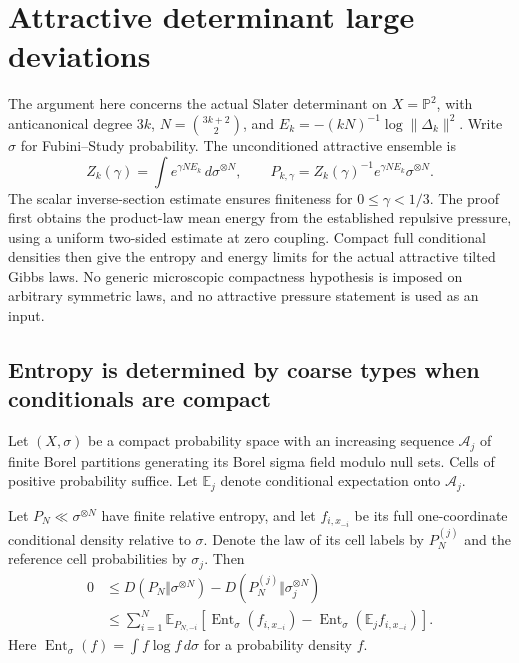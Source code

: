 \section{Attractive determinant large deviations}
\label{att:entropy-section}

The argument here concerns the actual Slater determinant on $X=\mathbb
P^2$, with anticanonical degree $3k$, $N=\binom{3k+2}{2}$, and
$E_k=-(kN)^{-1}\log\|\Delta_k\|^2$. Write $\sigma$ for
Fubini--Study probability. The unconditioned attractive ensemble is
\[
 Z_k(\gamma)=\int e^{\gamma N E_k}\,d\sigma^{\otimes N},
 \qquad P_{k,\gamma}=Z_k(\gamma)^{-1}e^{\gamma N E_k}\sigma^{\otimes N}.
\]
The scalar inverse-section estimate ensures finiteness for $0\le\gamma<1/3$.
The proof first obtains the product-law mean energy from the established
repulsive pressure, using a uniform two-sided estimate at zero coupling.
Compact full conditional densities then give the entropy and energy
limits for the actual attractive tilted Gibbs laws. No generic
microscopic compactness hypothesis is imposed on arbitrary symmetric
laws, and no attractive pressure statement is used as an input.

\subsection{Entropy is determined by coarse types when conditionals are compact}

Let $(X,\sigma)$ be a compact probability space with an increasing
sequence $\mathcal A_j$ of finite Borel partitions generating its Borel
sigma field modulo null sets. Cells of positive probability suffice.
Let $\mathbb E_j$ denote conditional expectation onto $\mathcal A_j$.

\begin{lemma}
\label{att:coarse-entropy}
Let $P_N\ll\sigma^{\otimes N}$ have finite relative entropy, and let
$f_{i,x_{-i}}$ be its full one-coordinate conditional density relative
to $\sigma$. Denote the law of its cell labels by $P_N^{(j)}$ and the
reference cell probabilities by $\sigma_j$. Then
\begin{align}
 0&\le D(P_N\Vert\sigma^{\otimes N})-
               D(P_N^{(j)}\Vert\sigma_j^{\otimes N})\\
 &\le\sum_{i=1}^N\mathbb E_{P_{N,-i}}
    \left[\operatorname{Ent}_\sigma(f_{i,x_{-i}})
              -\operatorname{Ent}_\sigma(\mathbb E_j f_{i,x_{-i}})\right].
 \label{att:coarse-bound}
\end{align}
Here $\operatorname{Ent}_\sigma(f)=\int f\log f\,d\sigma$ for a
probability density $f$.
\end{lemma}

